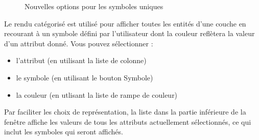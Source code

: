 \begin{figure}[ht]
\centering
   \hspace{1cm}
   \hspace{1cm}
\caption{Nouvelles options pour les symboles uniques \nixcaption}
\end{figure}


Le rendu catégorisé est utilisé pour afficher toutes les entités d'une couche en recourant à un symbole défini par l'utilisateur dont la couleur reflètera la valeur d'un attribut donné. Vous pouvez sélectionner :

\begin{itemize}[label=--]
\item l'attribut (en utilisant la liste de colonne)
\item le symbole (en utilisant le bouton Symbole)
\item la couleur (en utlisant la liste de rampe de couleur)
\end{itemize}

Par faciliter les choix de représentation, la liste dans la partie inférieure de la fenêtre affiche les valeurs de tous les attributs actuellement sélectionnés, ce qui inclut les symboles qui seront affichés.

